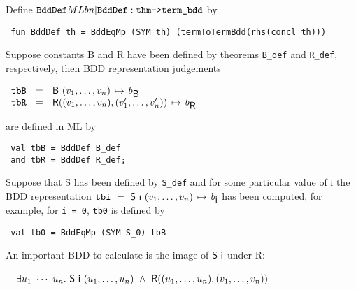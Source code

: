 \documentclass[12pt]{article}
\newcommand{\bnind}[1]{\index[MLbn]{#1}}
\newcommand{\con}[1]{\mbox{\sf #1}}
\newcommand{\ty}[1]{\mbox{\tt #1}}
\newcommand{\ml}[1]{{\tt #1}}
\newcommand{\globtermbdd}[2]{\mbox{$#1\hspace{0.5mm}\mapsto\hspace{0.5mm}#2$}}
\newcommand\termbddty{\ty{term\_bdd}}
\newcommand\fun{\mbox{\tt{->}}}
\begin{document}
\vspace*{-1mm}

\noindent Define $\ml{BddDef}\bnind{\ml{BddDef}}:\ty{thm}\fun\termbddty$ by

\vspace*{-1mm}

\begin{verbatim}
 fun BddDef th = BddEqMp (SYM th) (termToTermBdd(rhs(concl th)))
\end{verbatim}

\vspace*{-1mm}

Suppose constants \con{B} and \con{R} have been defined by theorems \ml{B\_def}
and \ml{R\_def}, respectively, then BDD representation judgements

\smallskip
$\begin{array}{l}
\ml{tbB}~~=~~\globtermbdd{\con{B}~(v_1,\ldots,v_n)}{b_{\con{B}}}\\
\ml{tbR}~~=~~\globtermbdd{\con{R}((v_1,\ldots,v_n),(v'_1,\ldots,v'_n))}{b_{\con{R}}}
\end{array}$
\smallskip

\noindent are defined in ML by

\vspace*{-1mm}

\begin{verbatim}
 val tbB = BddDef B_def
 and tbR = BddDef R_def;
\end{verbatim}

\vspace*{-1mm}

Suppose that \con{S} has been defined by \ml{S\_def} and for some
particular value of \con{i} the BDD representation
$\ml{tbi}~=~\globtermbdd{\con{S}~\con{i}~(v_1,\ldots,v_n)}{b_{\con{i}}}$
has been computed, for example, for \ml{\con{i} = 0}, \ml{tb0} is defined by

\vspace*{-1mm}

\begin{verbatim}
 val tb0 = BddEqMp (SYM S_0) tbB
\end{verbatim}

\vspace*{-1mm}

An important BDD to calculate is 
the image of $\con{S}~\con{i}$ under \con{R}:


\smallskip

~$\begin{array}{l}
\exists u_1~\cdots~u_n.~\con{S}~\con{i}~(u_1,\ldots,u_n)~\wedge~\con{R}((u_1,\ldots,u_n),(v_1,\ldots,v_n))
\end{array}
$
\end{document}

